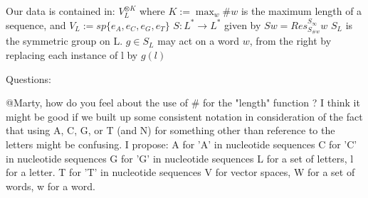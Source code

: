 \documentclass[aoas]{imsart}
\begin{document}
Our data is contained in:
$V_L^{\otimes K} $ where $K := \max_w \#w $ is the maximum length of a sequence, and $V_L := sp\{e_A, e_C, e_G,e_T\} $ 
$S:L^* \rightarrow L^* $ given by $Sw = Res^{S_\infty}_{S_{\#w} }w$
$S_L $ is the symmetric group on L. $g \in S_L$ may act on a word $w$, from the right by replacing each instance of l by $g(l)$ 


Questions:
\item @Marty, how do you feel about the use of $\#$ for the "length" function ? I think it might be good if we built up some consistent notation in consideration of the fact that using A, C, G, or T (and N) for something other than reference to the letters might  be confusing. I propose:
A for 'A' in nucleotide sequences
C for 'C' in nucleotide sequences
G for 'G' in nucleotide sequences
L for a set of letters, l for a letter.
T for 'T' in nucleotide sequences
V for vector spaces,
W for a set of words, w for a word.





\begin{thebibliography}{}
\end{thebibliography}
\end{document}
